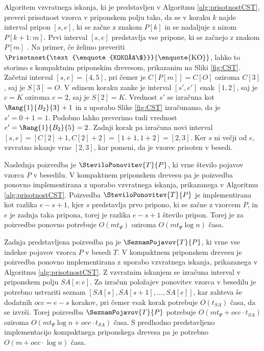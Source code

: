 Algoritem vzvratnega iskanja, ki je predstavljen v Algoritmu \ref{alg:prisotnostCST}, preveri prisotnost vzorca v priponskem polju tako, da se v koraku $k$ najde interval pripon $[s,e]$, ki se začne z znakom $P[k]$ in se nadaljuje z nizom $P[k+1:m]$. Prvi interval $[s,e]$ predstavlja vse pripone, ki se začnejo z znakom $P[m]$ \cite{Navarro2016}. Na primer, če želimo preveriti $\Prisotnost{\text{\enquote{KOKOŠ\$}}}{\text{\enquote{KO}}}$, lahko to storimo s kompaktnim priponskim drevesom, prikazanim na Sliki \ref{fig:CST}. Začetni interval $[s,e]=[4,5]$, pri čemer je $C[P[m]]=C[O]$ oziroma $C[3]$, saj je $S[3]=O$. V edinem koraku zanke je interval $[s',e']$ enak $[1,2]$, saj je $c=K$ oziroma $c=2$, saj je $S[2]=K$. Vrednost $s'$ se izračuna kot $\Rang{1}{B_2}{3}+1$ in z uporabo Slike \ref{fig:CST} izračunamo, da je $s'=0+1=1$. Podobno lahko preverimo tudi vrednost $e'=\Rang{1}{B_2}{5}=2$. Zadnji korak pa izračuna novi interval $[s,e]=[C[2]+1,C[2]+2]=[1+1,1+2]=[2,3]$. Ker $s$ ni večji od $e$, vzvratno iskanje vrne $[2,3]$, kar pomeni, da je vzorec prisoten v besedi.

Naslednja poizvedba je $\SteviloPonovitev{T}{P}$, ki vrne število pojavov vzorca $P$ v besedilu. V kompaktnem priponskem drevesu pa je poizvedba ponovno implementirana z uporabo vzvratnega iskanja, prikazanega v Algoritmu \ref{alg:prisotnostCST}. Poizvedba $\SteviloPonovitev{T}{P}$ je implementirana kot razlika $e-s+1$, kjer $s$ predstavlja prvo pripono, ki se začne z vzorcem $P$, in $e$ je zadnja taka pripona, torej je razlika $e-s+1$ število pripon. Torej je za poizvedbo ponovno potrebuje $O(mt_\Psi)$ oziroma $O(mt_\Psi\log{n})$ časa.

Zadnja predstavljena poizvedba pa je $\SeznamPojavov{T}{P}$, ki vrne vse indekse pojavov vzorca $P$ v besedi $T$. V kompaktnem priponskem drevesu je poizvedba ponovno implementirana z uporabo vzvratnega iskanja, prikazanega v Algoritmu \ref{alg:prisotnostCST}. Z vzvratnim iskanjem se izračuna interval v priponskem polju $SA[s:e]$. Za izračun položajev ponovitev vzorca v besedilu je potrebno ustvariti seznam $[SA[s],SA[s+1],\dots,SA[e]]$, kar zahteva še dodatnih $occ=e-s$ korakov, pri čemer vsak korak potrebuje $O(t_{SA})$ časa, da se izvrši. Torej poizvedba $\SeznamPojavov{T}{P}$ potrebuje $O(mt_\Psi+occ\cdot t_{SA})$ oziroma $O(mt_\Psi \log{n}+occ\cdot t_{SA})$ časa. S predhodno predstavljeno implementacijo kompaktnega priponskega drevesa pa je potrebno $O(m+occ\cdot\log{n})$ časa.

